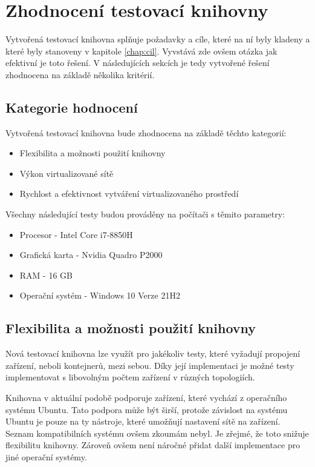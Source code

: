 \chapter{Zhodnocení testovací knihovny}\label{chap:review}

Vytvořená testovací knihovna splňuje požadavky a cíle, které na ní byly kladeny a které byly stanoveny v kapitole \ref{chap:cil}. Vyvstává zde ovšem otázka jak efektivní je toto řešení. V následujících sekcích je tedy vytvořené řešení zhodnocena na základě několika kritérií.

\section{Kategorie hodnocení}

Vytvořená testovací knihovna bude zhodnocena na základě těchto kategorií:

\begin{itemize}
    \item Flexibilita a možnosti použití knihovny
    \item Výkon virtualizované sítě
    \item Rychlost a efektivnost vytváření virtualizovaného prostředí
\end{itemize}

\noindent Všechny následující testy budou prováděny na počítači s těmito parametry:

\begin{itemize}
    \item Procesor - Intel Core i7-8850H
    \item Grafická karta - Nvidia Quadro P2000
    \item RAM - 16 GB
    \item Operační systém - Windows 10 Verze 21H2
\end{itemize}


\section{Flexibilita a možnosti použití knihovny}
Nová testovací knihovna lze využít pro jakékoliv testy, které vyžadují propojení zařízení, neboli kontejnerů, mezi sebou. Díky její implementaci je možné testy implementovat s libovolným počtem zařízení v různých topologiích.

Knihovna v aktuální podobě podporuje zařízení, které vychází z operačního systému Ubuntu. Tato podpora může být širší, protože závislost na systému Ubuntu je pouze na ty nástroje, které umožňují nastavení sítě na zařízení. Seznam kompatibilních systému ovšem zkoumám nebyl. Je zřejmé, že toto snižuje flexibilitu knihovny. Zároveň ovšem není náročné přidat další implementace pro jiné operační systémy. 

